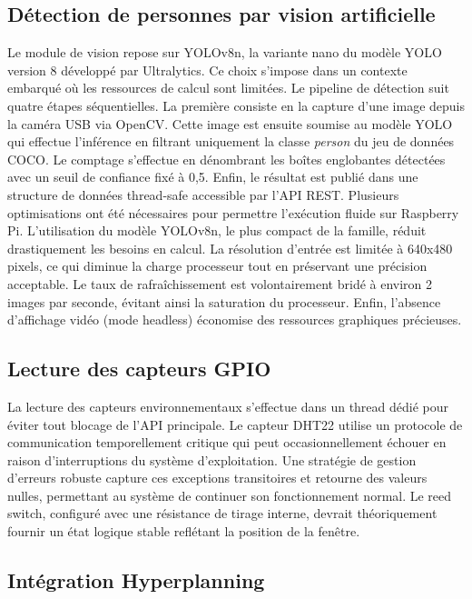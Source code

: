 \documentclass[a4paper,12pt]{report}
\begin{document}
\subsection{Détection de personnes par vision artificielle}

Le module de vision repose sur YOLOv8n, la variante nano du modèle YOLO version 8 développé par Ultralytics. Ce choix s'impose dans un contexte embarqué où les ressources de calcul sont limitées. Le pipeline de détection suit quatre étapes séquentielles. La première consiste en la capture d'une image depuis la caméra USB via OpenCV. Cette image est ensuite soumise au modèle YOLO qui effectue l'inférence en filtrant uniquement la classe \textit{person} du jeu de données COCO. Le comptage s'effectue en dénombrant les boîtes englobantes détectées avec un seuil de confiance fixé à 0,5. Enfin, le résultat est publié dans une structure de données thread-safe accessible par l'API REST.
\newpage
Plusieurs optimisations ont été nécessaires pour permettre l'exécution fluide sur Raspberry Pi. L'utilisation du modèle YOLOv8n, le plus compact de la famille, réduit drastiquement les besoins en calcul. La résolution d'entrée est limitée à 640x480 pixels, ce qui diminue la charge processeur tout en préservant une précision acceptable. Le taux de rafraîchissement est volontairement bridé à environ 2 images par seconde, évitant ainsi la saturation du processeur. Enfin, l'absence d'affichage vidéo (mode headless) économise des ressources graphiques précieuses.

\subsection{Lecture des capteurs GPIO}

La lecture des capteurs environnementaux s'effectue dans un thread dédié pour éviter tout blocage de l'API principale. Le capteur DHT22 utilise un protocole de communication temporellement critique qui peut occasionnellement échouer en raison d'interruptions du système d'exploitation. Une stratégie de gestion d'erreurs robuste capture ces exceptions transitoires et retourne des valeurs nulles, permettant au système de continuer son fonctionnement normal. Le reed switch, configuré avec une résistance de tirage interne, devrait théoriquement fournir un état logique stable reflétant la position de la fenêtre.

\subsection{Intégration Hyperplanning}
\end{document}
